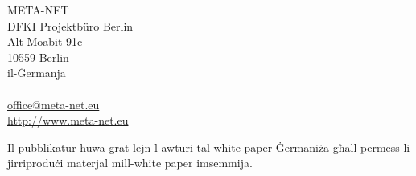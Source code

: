\documentclass[11pt]{article}
\begin{document}
  META-NET\\
  DFKI Projektbüro Berlin\\
  Alt-Moabit 91c\\
  10559 Berlin\\
  il-Ġermanja\\\\
  \url{office@meta-net.eu}\\
  \url{http://www.meta-net.eu}
  
  Il-pubblikatur huwa grat lejn l-awturi tal-white paper Ġermaniża għall-permess li jirriproduċi materjal mill-white paper imsemmija. 
  
    
\end{document}
